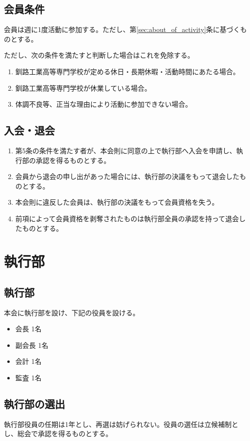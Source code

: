 \documentclass{jsreport}
\begin{document}
\section{会員条件}
会員は週に1度活動に参加する。ただし、第\ref{sec:about_of_activity}条に基づくものとする。

ただし、次の条件を満たすと判断した場合はこれを免除する。
\begin{enumerate}
    \item 釧路工業高等専門学校が定める休日・長期休暇・活動時間にあたる場合。
    \item 釧路工業高等専門学校が休業している場合。
    \item 体調不良等、正当な理由により活動に参加できない場合。
\end{enumerate}

\section{入会・退会}
\begin{enumerate}
    \item 第5条の条件を満たす者が、本会則に同意の上で執行部へ入会を申請し、執行部の承認を得るものとする。
    \item 会員から退会の申し出があった場合には、執行部の決議をもって退会したものとする。
    \item 本会則に違反した会員は、執行部の決議をもって会員資格を失う。
    \item 前項によって会員資格を剥奪されたものは執行部全員の承認を持って退会したものとする。
\end{enumerate}

\chapter{執行部}
\section{執行部}
本会に執行部を設け、下記の役員を設ける。
\begin{itemize}
    \item 会長 1名
    \item 副会長 1名
    \item 会計 1名
    \item 監査 1名
\end{itemize}

\section{執行部の選出}
執行部役員の任期は1年とし、再選は妨げられない。役員の選任は立候補制とし、総会で承認を得るものとする。
\end{document}
